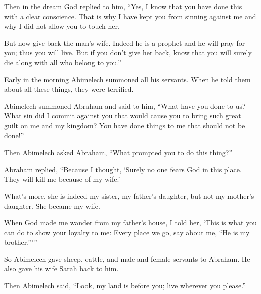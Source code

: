 \begin{scripture}
 Then in the dream God replied to him, ``Yes, I know that you have done this with a clear conscience. That is why I have kept you from sinning against me and why I did not allow you to touch her.
 But now give back the man's wife. Indeed he is a prophet and he will pray for you; thus you will live. But if you don't give her back, know that you will surely die along with all who belong to you.''
\everypar{}

 Early in the morning Abimelech summoned all his servants. When he told them about all these things, they were terrified.
 Abimelech summoned Abraham and said to him, ``What have you done to us? What sin did I commit against you that would cause you to bring such great guilt on me and my kingdom? You have done things to me that should not be done!''
 Then Abimelech asked Abraham, ``What prompted you to do this thing?''
\everypar{}

 Abraham replied, ``Because I thought, `Surely no one fears God in this place. They will kill me because of my wife.'
 What's more, she is indeed my sister, my father's daughter, but not my mother's daughter. She became my wife.
 When God made me wander from my father's house, I told her, `This is what you can do to show your loyalty to me: Every place we go, say about me, ``He is my brother.'''''
\everypar{}

 So Abimelech gave sheep, cattle, and male and female servants to Abraham. He also gave his wife Sarah back to him.
 Then Abimelech said, ``Look, my land is before you; live wherever you please.''
\everypar{}


\end{scripture}
